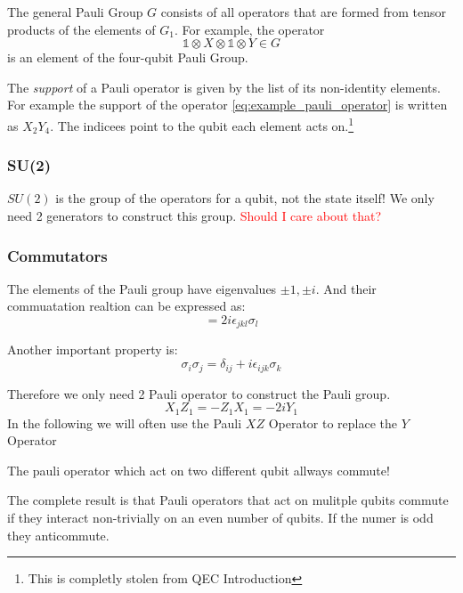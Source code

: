 The general Pauli Group $G$ consists of all operators that are formed from tensor products of the elements of $G_1$. 
For example, the operator
\begin{equation}
    \mathds{1} \otimes X \otimes \mathds{1} \otimes Y \in G
    \label{eq:example_pauli_operator}
\end{equation}
is an element of the four-qubit Pauli Group. 

The \textit{support} of a Pauli operator is given by the list of its non-identity elements.
For example the support of the operator \ref{eq:example_pauli_operator} is written as $X_2Y_4$.
The indicees point to the qubit each element acts on.\footnote{This is completly stolen from QEC Introduction}


\subsubsection{SU(2)}
$SU(2)$ is the group of the operators for a qubit, not the state itself!
We only need 2 generators to construct this group.
\textcolor{red}{Should I care about that?}

\subsubsection{Commutators}
The elements of the Pauli group have eigenvalues ${\pm 1,\pm i}$.
And their commuatation realtion can be expressed as:
\begin{equation}
    [\sigma_j,\sigma_k] = 2 i \epsilon_{jkl} \sigma_l
\end{equation}

Another important property is:
\begin{equation}
    \sigma_i \sigma_j = \delta_{ij} + i \epsilon_{ijk} \sigma_k
\end{equation}

Therefore we only need 2 Pauli operator to construct the Pauli group.
\begin{equation}
    X_1 Z_1 = - Z_1 X_1 = -2 i Y_1
\end{equation}
In the following we will often use the Pauli $XZ$ Operator to replace the $Y$ Operator 

The pauli operator which act on two different qubit allways commute!

The complete result is that Pauli operators that act on mulitple qubits commute if they interact non-trivially on an even number of qubits.
If the numer is odd they anticommute.

